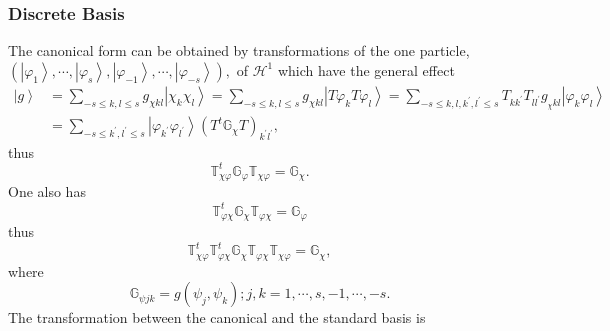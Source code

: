 \documentclass[aps,preprint]{revtex4}%
\begin{document}
\subsubsection{Discrete Basis}

The canonical form can be obtained by transformations of the one particle,
$\left(  \left\vert \varphi_{1}\right\rangle ,\cdots,\left\vert \varphi
_{s}\right\rangle ,\left\vert \varphi_{-1}\right\rangle ,\cdots,\left\vert
\varphi_{-s}\right\rangle \right)  ,$ of $\mathcal{H}^{1}$ which have the
general effect%
\begin{align}
\left\vert g\right\rangle  &  =\sum_{-s\leq k,l\leq s}g_{\chi kl}\left\vert
\chi_{k}\chi_{l}\right\rangle =\sum_{-s\leq k,l\leq s}g_{\chi kl}\left\vert
T\varphi_{k}T\varphi_{l}\right\rangle =\sum_{-s\leq k,l,k^{\prime},l^{\prime
}\leq s}T_{kk^{\prime}}T_{ll^{\prime}}g_{_{\chi}kl}\left\vert \varphi
_{k}\varphi_{l}\right\rangle \nonumber\\
&  =\sum_{-s\leq k^{\prime},l^{\prime}\leq s}\left\vert \varphi_{k^{\prime}%
}\varphi_{l^{\prime}}\right\rangle \left(  T^{t}\mathbb{G}_{\chi}T\right)
_{k^{\prime}l^{\prime}},
\end{align}
thus
\begin{equation}
\mathbb{T}_{\chi\varphi}^{t}\mathbb{G}_{\varphi}\mathbb{T}_{\chi\varphi
}=\mathbb{G}_{\chi}.
\end{equation}
One also has
\begin{equation}
\mathbb{T}_{\varphi\chi}^{t}\mathbb{G}_{\chi}\mathbb{T}_{\varphi\chi
}=\mathbb{G}_{\varphi}%
\end{equation}
thus
\begin{equation}
\mathbb{T}_{\chi\varphi}^{t}\mathbb{T}_{\varphi\chi}^{t}\mathbb{G}_{\chi
}\mathbb{T}_{\varphi\chi}\mathbb{T}_{\chi\varphi}=\mathbb{G}_{\chi},
\end{equation}
where%
\begin{equation}
\mathbb{G}_{\psi jk}=g\left(  \psi_{j},\psi_{k}\right)  ;j,k=1,\cdots
,s,-1,\cdots,-s.
\end{equation}
The transformation between the canonical and the standard basis is%
\end{document}
